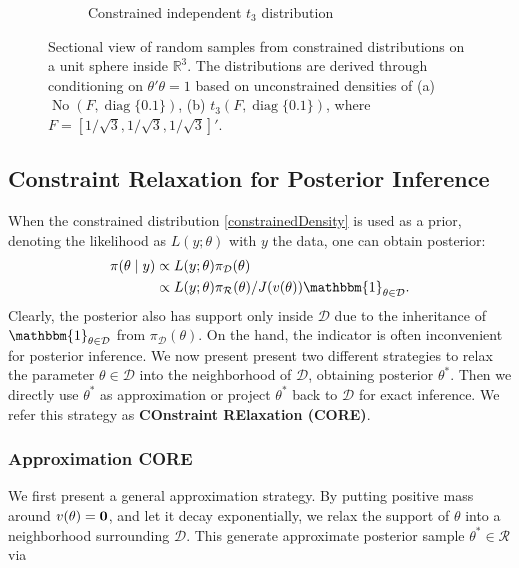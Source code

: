 \documentclass[10pt,fleqn]{article}
\newcommand{\be}{\begin{equation}\begin{aligned}}
\newcommand{\ee}{\end{aligned}\end{equation}}
\newcommand{\bb}[1]{\mathbb{#1}}
\newcommand{\mc}[1]{\mathcal{#1}}
\DeclareMathOperator{\No}{No}
\DeclareMathOperator{\diag}{diag}
\DeclareMathOperator{\1}{\mathbbm{1}}
\begin{document}
\begin{figure}[H]
\begin{subfigure}[b]{0.45\textwidth}
\caption{Constrained independent $t_3$ distribution}
\end{subfigure}
\caption{Sectional view of random samples from constrained distributions on a unit sphere inside $\bb R^3$. The distributions are derived through conditioning on $\theta'\theta=1$ based on unconstrained densities of (a) $\No( F, \diag\{0.1\})$, 
 (b) $t_3(F,\diag\{0.1\} )$, where $F=[1/\sqrt{3},1/\sqrt{3},1/\sqrt{3}]'$.}
\label{sphere_examples}
\end{figure}

\subsection{ Constraint Relaxation for Posterior Inference}

When the constrained distribution \eqref{constrainedDensity} is used as a prior,
denoting  the likelihood as $ L(y;\theta)$  with $y$ the data, one can obtain posterior:
\be
\label{exactPosterior}
\pi(\theta\mid y) & \propto L(y;\theta)\pi_{\mc D}(\theta) \\
& \propto L(y;\theta) \pi_{\mc
R}(\theta) /J(v(\theta))\mathbbm{1}_{\theta\in \mc D}.
\ee
Clearly, the
posterior also has support only inside $\mc D$ due to the inheritance of
$\mathbbm{1}_{\theta\in \mc D}$ from $\pi_{\mc D}(\theta)$. On the hand,
the indicator is often inconvenient for posterior inference. We now present
present two different strategies to relax the parameter $\theta\in \mc D$ into the neighborhood
of $\mc D$, obtaining posterior $\theta^*$. Then we directly use $\theta^*$ as approximation
or project $\theta^*$ back to $\mc D$ for exact inference. We refer this
strategy as {\bf COnstraint RElaxation (CORE)}.


 \subsubsection{Approximation CORE}

We first present a general approximation strategy. By putting positive mass around $v(\theta)=\bf
0$, and let it decay exponentially, we relax the support of $\theta$ into a
neighborhood surrounding $\mc D $. This generate approximate posterior sample $\theta^*\in \mc R$ via
\end{document}
